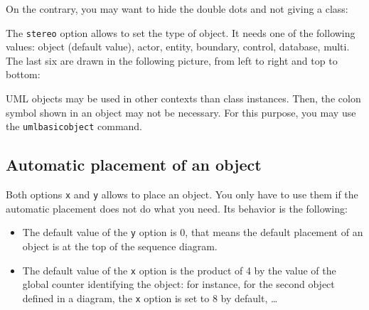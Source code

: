 \documentclass[a4paper,11pt]{report}
\begin{document}
\medskip

On the contrary, you may want to hide the double dots and not giving a class:

\medskip

\begin{minipage}{0.5\textwidth}

\end{minipage}
\begin{minipage}{0.5\textwidth}
\begin{center}
\end{center}
\end{minipage}

\medskip

The {\tt stereo} option allows to set the type of object. It needs one of the following values: object (default value), actor, entity, boundary, control, database, multi. The last six are drawn in the following picture, from left to right and top to bottom:

\medskip

\begin{minipage}{0.5\textwidth}

\end{minipage}
\begin{minipage}{0.5\textwidth}
\begin{center}
\end{center}
\end{minipage}

\medskip

UML objects may be used in other contexts than class instances. Then, the colon symbol shown in an object may not be necessary. For this purpose, you may use the {\tt umlbasicobject} command.

\subsection{Automatic placement of an object}\label{ss.objpos}

Both options {\tt x} and {\tt y} allows to place an object. You only have to use them if the automatic placement does not do what you need. Its behavior is the following:

\begin{itemize}
\item The default value of the {\tt y} option is 0, that means the default placement of an object is at the top of the sequence diagram.
\item The default value of the {\tt x} option is the product of 4 by the value of the global counter identifying the object: for instance, for the second object defined in a diagram, the {\tt x} option is set to 8 by default, \ldots
\end{itemize}
\end{document}
